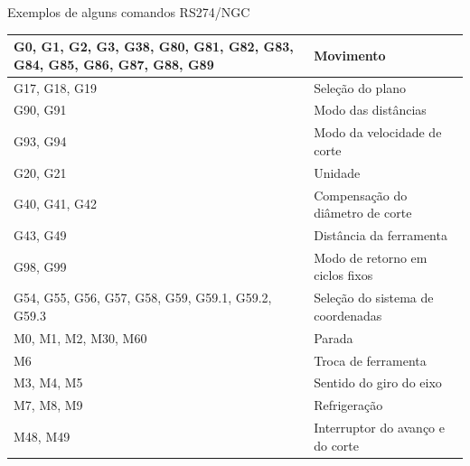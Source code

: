 \documentclass[aspectratio=169]{beamer}
\begin{document}
{\begin{frame}{Exemplos de alguns comandos RS274/NGC}
\begin{table}[H]
\begin{tabular}{p{7cm}|p{5cm}}
      \hline
      \scriptsize{G0, G1, G2, G3, G38, G80, G81, G82, G83, G84, G85, G86, G87, G88, G89} 
      & \scriptsize{Movimento} \\
  
      \hline
      \scriptsize{G17, G18, G19} 
      & \scriptsize{Sele\c c\~ao do plano} \\
  
      \hline
      \scriptsize{G90, G91}
      & \scriptsize{Modo das dist\^ancias} \\
  
      \hline
      \scriptsize{G93, G94}
      & \scriptsize{Modo da velocidade de corte} \\
  
      \hline
      \scriptsize{G20, G21}
      & \scriptsize{Unidade} \\
  
      \hline
      \scriptsize{G40, G41, G42}
      & \scriptsize{Compensa\c c\~ao do di\^ametro de corte} \\
  
      \hline
      \scriptsize{G43, G49}
      & \scriptsize{Dist\^ancia da ferramenta} \\
  
      \hline
      \scriptsize{G98, G99}
      & \scriptsize{Modo de retorno em ciclos fixos} \\
  
      \hline
      \scriptsize{G54, G55, G56, G57, G58, G59, G59.1, G59.2, G59.3}
      & \scriptsize{Sele\c c\~ao do sistema de coordenadas} \\
  
      \hline
      \scriptsize{M0, M1, M2, M30, M60}
      & \scriptsize{Parada} \\
  
      \hline
      \scriptsize{M6}
      & \scriptsize{Troca de ferramenta} \\
  
      \hline
      \scriptsize{M3, M4, M5}
      & \scriptsize{Sentido do giro do eixo} \\
  
      \hline
      \scriptsize{M7, M8, M9}
      & \scriptsize{Refrigera\c c\~ao} \\
  
      \hline
      \scriptsize{M48, M49}
      & \scriptsize{Interruptor do avan\c co e do corte} \\

      \hline
  
    \end{tabular}
  \end{table}


\end{frame}}
\end{document}
